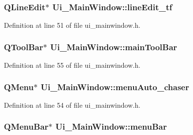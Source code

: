 \subsubsection[{\texorpdfstring{line\+Edit\+\_\+tf}{lineEdit_tf}}]{\setlength{\rightskip}{0pt plus 5cm}Q\+Line\+Edit$\ast$ Ui\+\_\+\+Main\+Window\+::line\+Edit\+\_\+tf}\hypertarget{class_ui___main_window_afc0d94ce5096c619c413cfae9b62014c}{}\label{class_ui___main_window_afc0d94ce5096c619c413cfae9b62014c}


Definition at line 51 of file ui\+\_\+mainwindow.\+h.

\subsubsection[{\texorpdfstring{main\+Tool\+Bar}{mainToolBar}}]{\setlength{\rightskip}{0pt plus 5cm}Q\+Tool\+Bar$\ast$ Ui\+\_\+\+Main\+Window\+::main\+Tool\+Bar}\hypertarget{class_ui___main_window_a5172877001c8c7b4e0f6de50421867d1}{}\label{class_ui___main_window_a5172877001c8c7b4e0f6de50421867d1}


Definition at line 55 of file ui\+\_\+mainwindow.\+h.

\subsubsection[{\texorpdfstring{menu\+Auto\+\_\+chaser}{menuAuto_chaser}}]{\setlength{\rightskip}{0pt plus 5cm}Q\+Menu$\ast$ Ui\+\_\+\+Main\+Window\+::menu\+Auto\+\_\+chaser}\hypertarget{class_ui___main_window_a8946bc17fa5b33e1c89ef82fdacab1d8}{}\label{class_ui___main_window_a8946bc17fa5b33e1c89ef82fdacab1d8}


Definition at line 54 of file ui\+\_\+mainwindow.\+h.

\subsubsection[{\texorpdfstring{menu\+Bar}{menuBar}}]{\setlength{\rightskip}{0pt plus 5cm}Q\+Menu\+Bar$\ast$ Ui\+\_\+\+Main\+Window\+::menu\+Bar}\hypertarget{class_ui___main_window_a2be1c24ec9adfca18e1dcc951931457f}{}\label{class_ui___main_window_a2be1c24ec9adfca18e1dcc951931457f}


